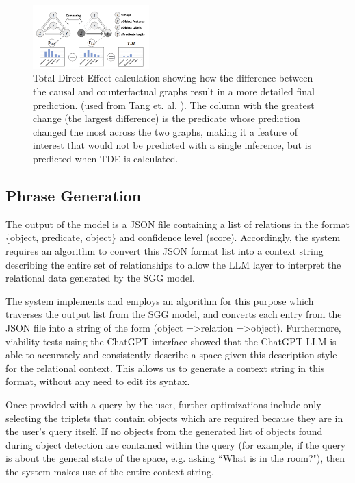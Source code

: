 \documentclass[letterpaper, 10 pt, conference]{ieeeconf}  %
\begin{document}
        \begin{figure}
            \centering
            \includegraphics[width=0.4\textwidth]{images/counterfactual.png}
            \caption{Total Direct Effect calculation showing how the difference between the causal and counterfactual graphs result in a more detailed final prediction. (used from Tang et. al. \cite{tang2020unbiased}). The column with the greatest change (the largest difference) is the predicate whose prediction changed the most across the two graphs, making it a feature of interest that would not be predicted with a single inference, but is predicted when TDE is calculated.}
            \label{fig:counterfactual}
        \end{figure}


    
    \subsection*{Phrase Generation}
        The output of the model is a JSON file containing a list of relations in the format \{object, predicate, object\} and confidence level (score). Accordingly, the system requires an algorithm to convert this JSON format list into a context string describing the entire set of relationships to allow the LLM layer to interpret the relational data generated by the SGG model. 
        
        The system implements and employs an algorithm for this purpose which traverses the output list from the SGG model, and converts each entry from the JSON file into a string of the form (object =\textgreater  relation =\textgreater  object). Furthermore, viability tests using the ChatGPT interface showed that the ChatGPT LLM is able to accurately and consistently describe a space given this description style for the relational context. This allows us to generate a context string in this format, without any need to edit its syntax.
        
        Once provided with a query by the user, further optimizations include only selecting the triplets that contain objects which are required because they are in the user's query itself. If no objects from the generated list of objects found during object detection are contained within the query (for example, if the query is about the general state of the space, e.g. asking ``What is in the room?"), then the system makes use of the entire context string. 
        
\end{document}
